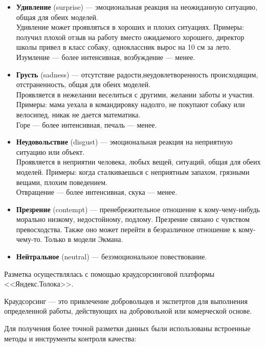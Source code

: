 \begin{itemize}
\item \textbf{Удивление} (surprise) --- эмоциональная реакция на неожиданную ситуацию, общая для обеих моделей.\\
Удивление может проявляться в хороших и плохих ситуациях.
Примеры: получил плохой отзыв на работу вместо ожидаемого хорошего, директор школы привел в класс собаку, одноклассник вырос на 10 см за лето.\\
Изумление --- более интенсивная, возбуждение --- менее.


\item \textbf{Грусть} (sadness) --- отсутствие радости,​ неудовлетворенность происходящим, отстраненность, общая для обеих моделей.\\
Проявляется в нежелании веселиться с другими, желании заботы и участия.
Примеры: мама уехала в командировку надолго, не покупают собаку или велосипед, никак не дается математика.\\
Горе --- более интенсивная, печаль --- менее.

\item \textbf{Неудовольствие} (disgust) --- эмоциональная реакция на неприятную ситуацию или объект.\\
Проявляется в неприятии человека, любых вещей, ситуаций, общая для обеих моделей.
Примеры: когда сталкиваешься с неприятным запахом, грязными вещами, плохим поведением.\\
Отвращение --- более интенсивная, скука --- менее.

\item \textbf{Презрение} (contempt) --- пренебрежительное отношение к кому-чему-нибудь морально низкому, недостойному, подлому. Презрение связано с чувством превосходства. Также оно может перейти в безразличное отношение к кому-чему-то. Только в модели Экмана.

\item \textbf{Нейтральное} (neutral) --- безэмоциональное повествование.

\end{itemize}

\bigskip
Разметка осуществлялась с помощью краудсорсинговой платформы <<Яндекс.Толока>>.

\begin{definition}
 Краудсорсинг --- это привлечение добровольцев и экспетртов для выполнения определенной работы, действующих на добровольной или комерческой основе.
\end{definition}

Для получения более точной разметки данных были использованы встроенные методы и инструменты контроля качества:

